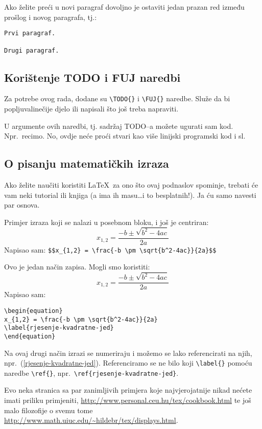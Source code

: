 \documentclass{article}
\begin{document}
Ako želite preći u novi paragraf dovoljno je ostaviti jedan prazan red između
prošlog i novog paragrafa, tj.:
\begin{verbatim}
Prvi paragraf.

Drugi paragraf.
\end{verbatim}

\subsection{Korištenje TODO i FUJ naredbi}
Za potrebe ovog rada, dodane su \verb|\TODO{}| i \verb|\FUJ{}| naredbe. Služe
da bi popljuvalinečije djelo ili napisali što još treba
napraviti.

U argumente ovih naredbi, tj. sadržaj \textsf{TODO}--a možete ugurati sam kod.
Npr.~recimo. No, ovdje neće proći stvari kao više
linijski programski kod i sl.

\subsection{O pisanju matematičkih izraza}
Ako želite naučiti koristiti \LaTeX~za ono što ovaj podnaslov spominje, trebati
će vam neki tutorial ili knjiga (a ima ih masu\ldots i to besplatnih!).
Ja ću samo navesti par osnova.

Primjer izraza koji se nalazi u posebnom bloku, i još je centriran:
$$x_{1,2} = \frac{-b \pm \sqrt{b^2-4ac}}{2a}$$
Napisao sam: \verb|$$x_{1,2} = \frac{-b \pm \sqrt{b^2-4ac}}{2a}$$|

Ovo je jedan način zapisa. Mogli smo koristiti:
\begin{equation}
x_{1,2} = \frac{-b \pm \sqrt{b^2-4ac}}{2a}
\label{rjesenje-kvadratne-jed}
\end{equation}
Napisao sam:
\begin{verbatim}
\begin{equation}
x_{1,2} = \frac{-b \pm \sqrt{b^2-4ac}}{2a}
\label{rjesenje-kvadratne-jed}
\end{equation}
\end{verbatim}

Na ovaj drugi način izrazi se numeriraju i možemo se lako referencirati na
njih, npr.~(\ref{rjesenje-kvadratne-jed}). Referenciramo se ne bilo koji
\verb|\label{}| pomoću naredbe \verb|\ref{}|,
npr.~\verb|\ref{rjesenje-kvadratne-jed}|.

Evo neka stranica sa par zanimljivih primjera koje najvjerojatnije nikad nećete
imati priliku primjeniti, \url{http://www.personal.ceu.hu/tex/cookbook.html} te
još malo filozofije o svemu tome
\url{http://www.math.uiuc.edu/~hildebr/tex/displays.html}.
\end{document}
